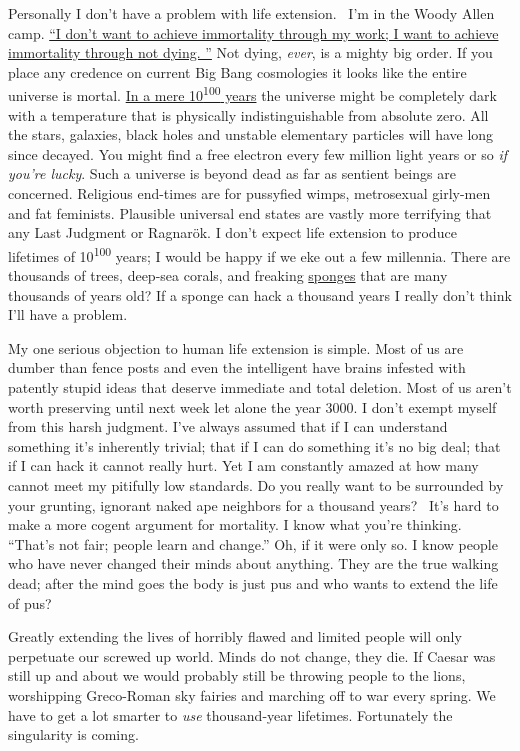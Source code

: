 Personally I don't have a problem with life extension.~ I'm in the Woody
Allen camp.
\href{http://www.goodreads.com/quotes/1066-i-don-t-want-to-achieve-immortality-through-my-work-i}{``I don't want to
achieve immortality through my work; I want to achieve immortality through not dying. ''}  Not dying, \emph{ever}, is a mighty big
order. If you place any credence on current Big Bang cosmologies it
looks like the entire universe is mortal.
\href{http://www.futuretimeline.net/beyond.htm\#3000000000}{In a mere
10\textsuperscript{100} years} the universe might be completely dark
with a temperature that is physically indistinguishable from absolute
zero. All the stars, galaxies, black holes and unstable elementary
particles will have long since decayed. You might find a free electron
every few million light years or so \emph{if you're lucky}. Such a
universe is beyond dead as far as sentient beings are concerned.
Religious end-times are for pussyfied wimps, metrosexual girly-men and
fat feminists. Plausible universal end states are vastly more terrifying
that any Last Judgment or Ragnarök. I don't expect life extension to
produce lifetimes of 10\textsuperscript{100} years; I would be happy if
we eke out a few millennia. There are thousands of trees, deep-sea
corals, and freaking
\href{http://en.wikipedia.org/wiki/List_of_longest-living_organisms}{sponges}
that are many thousands of years old? If a sponge can hack a thousand
years I really don't think I'll have a problem.

My one serious objection to human life extension is simple. Most of us
are dumber than fence posts and even the intelligent have brains
infested with patently stupid ideas that deserve immediate and total
deletion. Most of us aren't worth preserving until next week let alone
the year 3000. I don't exempt myself from this harsh judgment. I've
always assumed that if I can understand something it's inherently
trivial; that if I can do something it's no big deal; that if I can hack
it cannot really hurt. Yet I am constantly amazed at how many cannot
meet my pitifully low standards. Do you really want to be surrounded by
your grunting, ignorant naked ape neighbors for a thousand years?~ It's
hard to make a more cogent argument for mortality. I know what you're
thinking. ``That's not fair; people learn and change.'' Oh, if it were
only so. I know people who have never changed their minds about
anything. They are the true walking dead; after the mind goes the body
is just pus and who wants to extend the life of pus?

Greatly extending the lives of horribly flawed and limited people will
only perpetuate our screwed up world. Minds do not change, they die. If
Caesar was still up and about we would probably still be throwing people
to the lions, worshipping Greco-Roman sky fairies and marching off to
war every spring. We have to get a lot smarter to \emph{use}
thousand-year lifetimes. Fortunately the singularity is coming.

